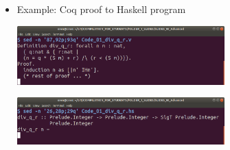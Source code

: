 \begin{frame}
\begin{itemize}
\begin{itemize}
\end{itemize}

\item<3-> Example: Coq proof to Haskell program

\includegraphics[width=8cm]{FOLDER_3_IMG_FILES/Code_01_div_q_r_coq.png}

\includegraphics[width=8cm]{FOLDER_3_IMG_FILES/Code_01_div_q_r_hs.png}

\end{itemize}

\end{frame}
